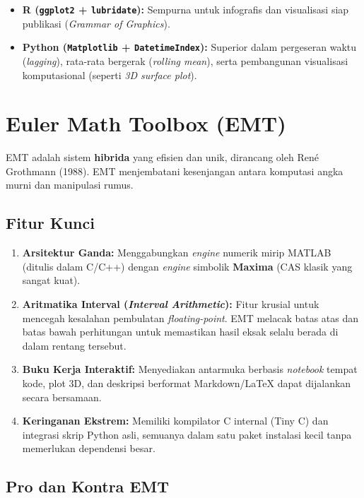 \documentclass[11pt, a4paper, numbers=enddot, oneside]{scrbook}
\begin{document}
\begin{itemize}
    \item \textbf{R (\texttt{ggplot2} + \texttt{lubridate}):} Sempurna untuk infografis dan visualisasi siap publikasi (\emph{Grammar of Graphics}).
    \item \textbf{Python (\texttt{Matplotlib} + \texttt{DatetimeIndex}):} Superior dalam pergeseran waktu (\emph{lagging}), rata-rata bergerak (\emph{rolling mean}), serta pembangunan visualisasi komputasional (seperti \emph{3D surface plot}).
\end{itemize}

\chapter{Euler Math Toolbox (EMT)}

EMT adalah sistem \textbf{hibrida} yang efisien dan unik, dirancang oleh René Grothmann (1988). EMT menjembatani kesenjangan antara komputasi angka murni dan manipulasi rumus.

\section*{Fitur Kunci}

\begin{enumerate}
    \item \textbf{Arsitektur Ganda:} Menggabungkan \emph{engine} numerik mirip MATLAB (ditulis dalam C/C++) dengan \emph{engine} simbolik \textbf{Maxima} (CAS klasik yang sangat kuat).
    \item \textbf{Aritmatika Interval (\emph{Interval Arithmetic}):} Fitur krusial untuk mencegah kesalahan pembulatan \emph{floating-point}. EMT melacak batas atas dan batas bawah perhitungan untuk memastikan hasil eksak selalu berada di dalam rentang tersebut.
    \item \textbf{Buku Kerja Interaktif:} Menyediakan antarmuka berbasis \emph{notebook} tempat kode, plot 3D, dan deskripsi berformat Markdown/LaTeX dapat dijalankan secara bersamaan.
    \item \textbf{Keringanan Ekstrem:} Memiliki kompilator C internal (Tiny C) dan integrasi skrip Python asli, semuanya dalam satu paket instalasi kecil tanpa memerlukan dependensi besar.
\end{enumerate}

\section*{Pro dan Kontra EMT}
\end{document}
